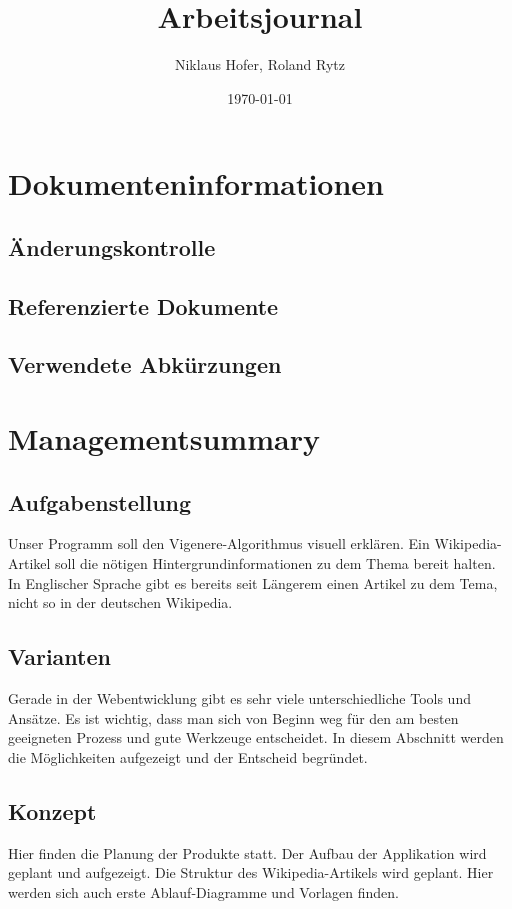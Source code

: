 \documentclass[11pt,paper=a4,final]{scrartcl}
\title{Arbeitsjournal}
\author{Niklaus Hofer, Roland Rytz}
\date{\today{}}
\begin{document}
\maketitle
\newpage
\begin{abstract}
\end{abstract}
\section{Dokumenteninformationen}
\subsection{\"Anderungskontrolle}
\subsection{Referenzierte Dokumente}
\subsection{Verwendete Abk\"urzungen}
\tableofcontents
\section{Managementsummary}
\subsection{Aufgabenstellung}
Unser Programm soll den Vigenere-Algorithmus visuell erkl\"aren. Ein
Wikipedia-Artikel soll die n\"otigen Hintergrundinformationen zu dem Thema
bereit halten. In Englischer Sprache gibt es bereits seit L\"angerem einen
Artikel zu dem Tema, nicht so in der deutschen Wikipedia.
\subsection{Varianten}
Gerade in der Webentwicklung gibt es sehr viele unterschiedliche Tools und
Ans\"atze. Es ist wichtig, dass man sich von Beginn weg f\"ur den am besten
geeigneten Prozess und gute Werkzeuge entscheidet. In diesem Abschnitt werden
die M\"oglichkeiten aufgezeigt und der Entscheid begr\"undet.
\subsection{Konzept}
Hier finden die Planung der Produkte statt. Der Aufbau der Applikation wird
geplant und aufgezeigt. Die Struktur des Wikipedia-Artikels wird geplant. Hier
werden sich auch erste Ablauf-Diagramme und Vorlagen finden.
\end{document}
